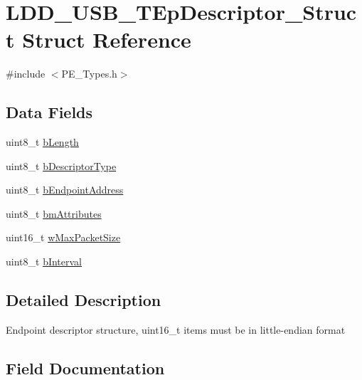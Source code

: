 \hypertarget{struct_l_d_d___u_s_b___t_ep_descriptor___struct}{}\section{L\+D\+D\+\_\+\+U\+S\+B\+\_\+\+T\+Ep\+Descriptor\+\_\+\+Struct Struct Reference}
\label{struct_l_d_d___u_s_b___t_ep_descriptor___struct}


{\ttfamily \#include $<$P\+E\+\_\+\+Types.\+h$>$}

\subsection*{Data Fields}
\begin{DoxyCompactItemize}
\item 
uint8\+\_\+t \hyperlink{struct_l_d_d___u_s_b___t_ep_descriptor___struct_a1deca1f1d6e5815b290e6e1015bce5b8}{b\+Length}
\item 
uint8\+\_\+t \hyperlink{struct_l_d_d___u_s_b___t_ep_descriptor___struct_a67d7027b9eb9ed268d28e84fbc675707}{b\+Descriptor\+Type}
\item 
uint8\+\_\+t \hyperlink{struct_l_d_d___u_s_b___t_ep_descriptor___struct_a527afb0f25cdd442d8d32c7df8e18c45}{b\+Endpoint\+Address}
\item 
uint8\+\_\+t \hyperlink{struct_l_d_d___u_s_b___t_ep_descriptor___struct_ae7c63b4cda39953db5710012a5d91c6f}{bm\+Attributes}
\item 
uint16\+\_\+t \hyperlink{struct_l_d_d___u_s_b___t_ep_descriptor___struct_abcc8edb1d5094ce6a16b42c1a7ae67d8}{w\+Max\+Packet\+Size}
\item 
uint8\+\_\+t \hyperlink{struct_l_d_d___u_s_b___t_ep_descriptor___struct_aff92277eea8536f7de1a88d818c91b9e}{b\+Interval}
\end{DoxyCompactItemize}


\subsection{Detailed Description}
Endpoint descriptor structure, uint16\+\_\+t items must be in little-\/endian format 

\subsection{Field Documentation}
\mbox{\label{struct_l_d_d___u_s_b___t_ep_descriptor___struct_a67d7027b9eb9ed268d28e84fbc675707}} 

